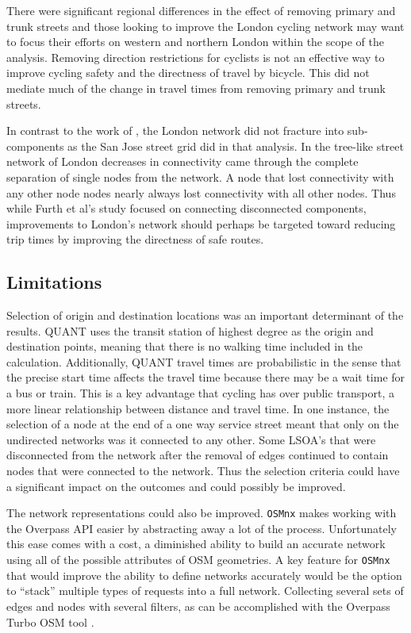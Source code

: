 There were significant regional differences in the effect of removing primary and trunk streets and those looking to improve the London cycling network may want to focus their efforts on western and northern London within the scope of the analysis. Removing direction restrictions for cyclists is not an effective way to improve cycling safety and the directness of travel by bicycle. This did not mediate much of the change in travel times from removing primary and trunk streets. 

In contrast to the work of \textcite{furth2016network}, the London network did not fracture into sub-components as the San Jose street grid did in that analysis. In the tree-like street network of London decreases in connectivity came through the complete separation of single nodes from the network. A node that lost connectivity with any other node nodes nearly always lost connectivity with all other nodes. Thus while Furth et al's study focused on connecting disconnected components, improvements to London's network should perhaps be targeted toward reducing trip times by improving the directness of safe routes. 

\subsection{Limitations}

Selection of origin and destination locations was an important determinant of the results. QUANT uses the transit station of highest degree as the origin and destination points, meaning that there is no walking time included in the calculation. Additionally, QUANT travel times are probabilistic in the sense that the precise start time affects the travel time because there may be a wait time for a bus or train. This is a key advantage that cycling has over public transport, a more linear relationship between distance and travel time. In one instance, the selection of a node at the end of a one way service street meant that only on the undirected networks was it connected to any other. Some LSOA's that were disconnected from the network after the removal of edges continued to contain nodes that were connected to the network. Thus the selection criteria could have a significant impact on the outcomes and could possibly be improved. 

The network representations could also be improved. \texttt{OSMnx} makes working with the Overpass API easier by abstracting away a lot of the process. Unfortunately this ease comes with a cost, a diminished ability to build an accurate network using all of the possible attributes of OSM geometries. A key feature for \texttt{OSMnx} that would improve the ability to define networks accurately would be the option to ``stack'' multiple types of requests into a full network. Collecting several sets of edges and nodes with several filters, as can be accomplished with the Overpass Turbo OSM tool \parencite{overpass_turbo}. 


